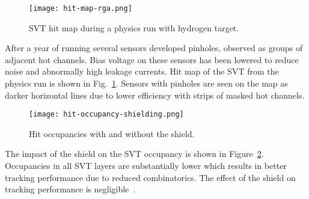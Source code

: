 \begin{figure}[hbt] 
\centering 
\texttt{[image: hit-map-rga.png]}
\caption{SVT hit map during a physics run with hydrogen target.}
\label{fig:hit-map-rga}
\end{figure}

After a year of running several sensors developed pinholes, observed as groups of adjacent hot channels. Bias voltage on these sensors has been lowered to reduce noise and abnormally high leakage currents. Hit map of the SVT from the physics run is shown in Fig.~\ref{fig:hit-map-rga}. Sensors with pinholes are seen on the map as darker horizontal lines due to lower efficiency with strips of masked hot channels. 

\begin{figure}[hbt] 
\centering 
\texttt{[image: hit-occupancy-shielding.png]}
\caption{Hit occupancies with and without the shield.}
\label{fig:hit-occupancy-shielding}
\end{figure}

The impact of the shield on the SVT occupancy is shown in Figure~\ref{fig:hit-occupancy-shielding}. Occupancies in all SVT layers are substantially lower which results in better tracking performance due to reduced combinatorics. The effect of the shield on tracking performance is negligible~\cite{SHIELDNOTE}.


